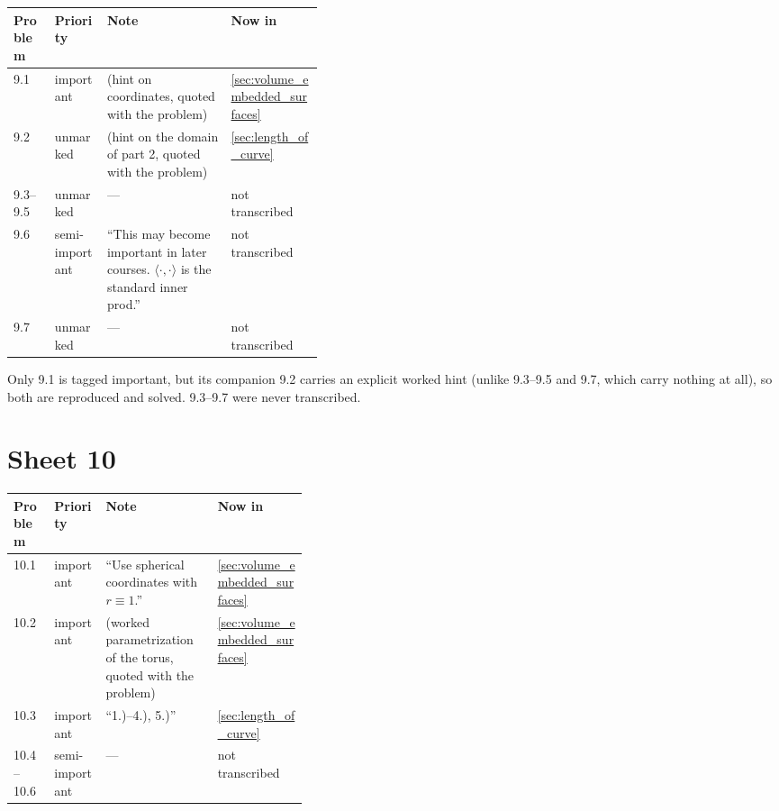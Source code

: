 \begin{center}
\begin{tabular}{@{}l l p{0.40\linewidth} l@{}}
\textbf{Problem} & \textbf{Priority} & \textbf{Note} & \textbf{Now in} \\
\hline
9.1 & important & (hint on coordinates, quoted with the problem) &
  \cref{sec:volume_embedded_surfaces} \\[3pt]
9.2 & unmarked & (hint on the domain of part 2, quoted with the problem) &
  \cref{sec:length_of_curve} \\[3pt]
9.3--9.5 & unmarked & --- & not transcribed \\[3pt]
9.6 & semi-important & ``This may become important in later courses.
  $\langle\cdot,\cdot\rangle$ is the standard inner prod.'' & not transcribed \\[3pt]
9.7 & unmarked & --- & not transcribed \\
\end{tabular}
\end{center}

\begin{ainote}
Only 9.1 is tagged important, but its companion 9.2 carries an explicit worked hint (unlike 9.3--9.5 and 9.7, which carry nothing at all), so both are reproduced and solved.
9.3--9.7 were never transcribed.
\end{ainote}

\section{Sheet 10}
\label{sec:sheet_index_10}

\begin{center}
\begin{tabular}{@{}l l p{0.38\linewidth} l@{}}
\textbf{Problem} & \textbf{Priority} & \textbf{Note} & \textbf{Now in} \\
\hline
10.1 & important & ``Use spherical coordinates with $r\equiv1$.'' &
  \cref{sec:volume_embedded_surfaces} \\[3pt]
10.2 & important & (worked parametrization of the torus, quoted with the problem) &
  \cref{sec:volume_embedded_surfaces} \\[3pt]
10.3 & important & ``1.)--4.), 5.)'' & \cref{sec:length_of_curve} \\[3pt]
10.4--10.6 & semi-important & --- & not transcribed \\
\end{tabular}
\end{center}

